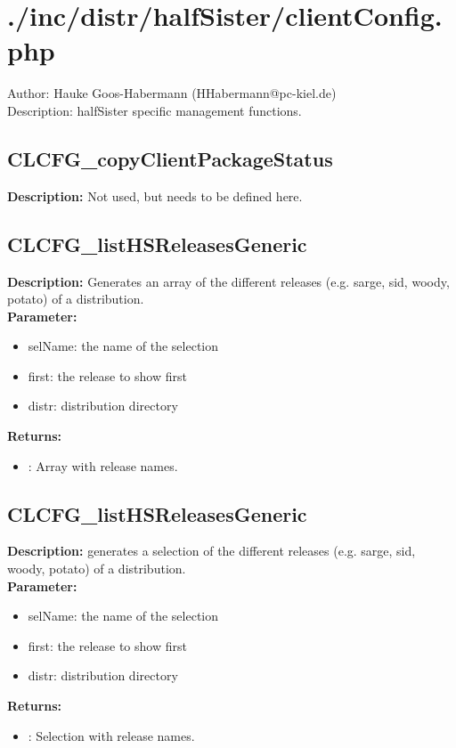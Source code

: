 \newpage\section{./inc/distr/halfSister/clientConfig.php}
 Author: Hauke Goos-Habermann (HHabermann@pc-kiel.de)\\
 Description: halfSister specific management functions.\\

\subsection{CLCFG\_copyClientPackageStatus}
\textbf{Description:} Not used, but needs to be defined here.\\

\subsection{CLCFG\_listHSReleasesGeneric}
\textbf{Description:} Generates an array of the different releases (e.g. sarge, sid, woody, potato) of a distribution.\\
\textbf{Parameter:}
\begin{itemize}
\item selName: the name of the selection
\item first: the release to show first
\item distr: distribution directory
\end{itemize}
\textbf{Returns:}
\begin{itemize}
\item : Array with release names.
\end{itemize}

\subsection{CLCFG\_listHSReleasesGeneric}
\textbf{Description:} generates a selection of the different releases (e.g. sarge, sid, woody, potato) of a distribution.\\
\textbf{Parameter:}
\begin{itemize}
\item selName: the name of the selection
\item first: the release to show first
\item distr: distribution directory
\end{itemize}
\textbf{Returns:}
\begin{itemize}
\item : Selection with release names.
\end{itemize}

